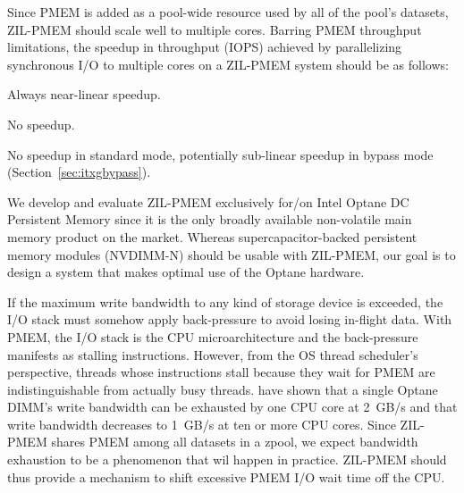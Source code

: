 \documentclass[12pt,a4paper,twoside]{book}
\begin{document}
Since PMEM is added as a pool-wide resource used by all of the pool's datasets, ZIL-PMEM should scale well to multiple cores.
Barring PMEM throughput limitations, the speedup in throughput (IOPS) achieved by parallelizing synchronous I/O to multiple cores on a ZIL-PMEM system should be as follows:
{
\setlength{\parskip}{0pt}
\begin{description}[topsep=0pt, noitemsep, leftmargin=1cm, labelindent=1cm, widest=1 private dataset per thread]
    \item[1 private dataset per thread] Always near-linear speedup.
    \item[1 shared dataset] \mbox{}
          \begin{description}[noitemsep, leftmargin=1cm, labelindent=1cm, widest=ZPL filesystem]
              \item[ZPL filesystem] No speedup.
              \item[ZVOL] No speedup in standard mode, potentially sub-linear speedup in bypass mode (Section~\ref{sec:itxgbypass}).
          \end{description}
\end{description}
}

We develop and evaluate ZIL-PMEM exclusively for/on Intel Optane DC Persistent Memory since it is the only broadly available non-volatile main memory product on the market.
Whereas supercapacitor-backed persistent memory modules (NVDIMM-N) should be usable with ZIL-PMEM, our goal is to design a system that makes optimal use of the Optane hardware.

If the maximum write bandwidth to any kind of storage device is exceeded, the I/O stack must somehow apply back-pressure to avoid losing in-flight data.
With PMEM, the I/O stack is the CPU microarchitecture and the back-pressure manifests as stalling instructions.
However, from the OS thread scheduler's perspective, threads whose instructions stall because they wait for PMEM are indistinguishable from actually busy threads.
\citeauthor{yangEmpiricalGuideBehavior2020} have shown that a single Optane DIMM's write bandwidth can be exhausted by one CPU core at 2~GB/s and that write bandwidth decreases to 1~GB/s at ten or more CPU cores.
Since ZIL-PMEM shares PMEM among all datasets in a zpool, we expect bandwidth exhaustion to be a phenomenon that wil happen in practice.
ZIL-PMEM should thus provide a mechanism to shift excessive PMEM I/O wait time off the CPU.
\end{document}
